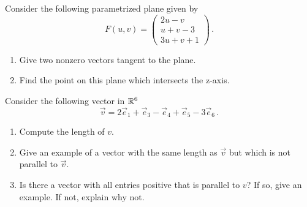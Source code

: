 \documentclass[12pt]{amsart}
\begin{document}
\begin{problem}
    Consider the following parametrized plane given by
    \begin{equation*}
        F(u,v) = \begin{pmatrix}
            2u - v \\ u + v -3 \\ 3u + v + 1 
        \end{pmatrix}\,.
    \end{equation*}
    \begin{enumerate}
        \item Give two nonzero vectors tangent to the plane.
        \item Find the point on this plane which intersects the z-axis.
    \end{enumerate}
\end{problem}

\begin{problem}
    Consider the following vector in $\mathbb{R}^6$
    $$ \vec{v} = 2 \vec{e}_1 + \vec{e}_3 - \vec{e}_4 + \vec{e}_5 - 3 \vec{e}_6 \,.$$
    \begin{enumerate}
        \item Compute the length of $v$.
        \item Give an example of a vector with the same length as $\vec{v}$ 
            but which is not parallel to $\vec{v}$.
        \item Is there a vector with all entries positive that is parallel to $v$? 
            If so, give an example. If not, explain why not.
    \end{enumerate}
\end{problem}
\end{document}
